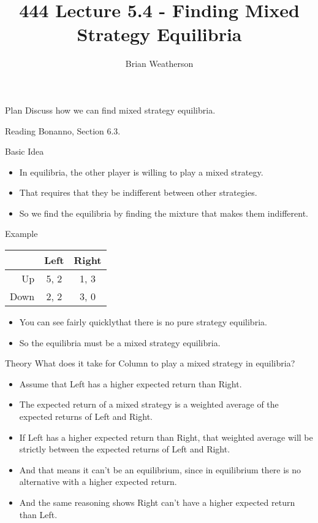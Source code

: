 \documentclass[
  ignorenonframetext,
]{beamer}
\title{444 Lecture 5.4 - Finding Mixed Strategy Equilibria}
\author{Brian Weatherson}
\date{}
\providecommand{\tightlist}{%
  \setlength{\itemsep}{0pt}\setlength{\parskip}{0pt}}
\begin{document}
\frame{\titlepage}

\begin{frame}{Plan}
\protect\hypertarget{plan}{}
Discuss how we can find mixed strategy equilibria.
\end{frame}

\begin{frame}{Reading}
\protect\hypertarget{reading}{}
Bonanno, Section 6.3.
\end{frame}

\begin{frame}{Basic Idea}
\protect\hypertarget{basic-idea}{}
\begin{itemize}
\tightlist
\item
  In equilibria, the other player is willing to play a mixed strategy.
\item
  That requires that they be indifferent between other strategies.
\item
  So we find the equilibria by finding the mixture that makes them
  indifferent.
\end{itemize}
\end{frame}

\begin{frame}{Example}
\protect\hypertarget{example}{}
\begin{table}[!h]
\centering
\begin{tabular}[t]{>{}r|cc}
\toprule
 & Left & Right\\
\midrule
Up & 5, 2 & 1, 3\\
Down & 2, 2 & 3, 0\\
\bottomrule
\end{tabular}
\end{table}

\begin{itemize}
\tightlist
\item
  You can see fairly quicklythat there is no pure strategy equilibria.
\item
  So the equilibria must be a mixed strategy equilibria.
\end{itemize}
\end{frame}

\begin{frame}{Theory}
\protect\hypertarget{theory}{}
What does it take for Column to play a mixed strategy in equilibria?

\begin{itemize}
\tightlist
\item
  Assume that Left has a higher expected return than Right.
\item
  The expected return of a mixed strategy is a weighted average of the
  expected returns of Left and Right.
\item
  If Left has a higher expected return than Right, that weighted average
  will be strictly between the expected returns of Left and Right.
\item
  And that means it can't be an equilibrium, since in equilibrium there
  is no alternative with a higher expected return. \pause
\item
  And the same reasoning shows Right can't have a higher expected return
  than Left.
\end{itemize}
\end{frame}
\end{document}
